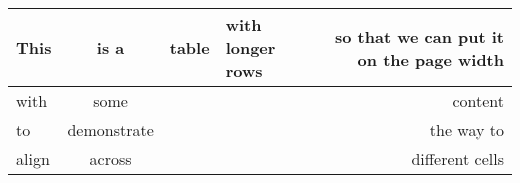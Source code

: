 \begin{longtable}[]{@{}lcllr@{}}
\toprule
This & is a & table & with longer rows & so that we can put it on the
page width\tabularnewline
\midrule
\endhead
with & some & & & content\tabularnewline
to & demonstrate & & & the way to\tabularnewline
align & across & & & different cells\tabularnewline
\bottomrule
\end{longtable}
